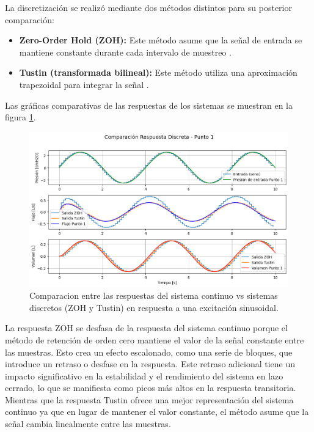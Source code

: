 \documentclass[journal]{IEEEtran}
\begin{document}
La discretización se realizó mediante dos métodos distintos para su posterior comparación:

\begin{itemize}
    \item \textbf{Zero-Order Hold (ZOH):} Este método asume que la señal de entrada se mantiene constante durante cada intervalo de muestreo \cite{mathworks_continuous_discrete_nodate}.
    \item \textbf{Tustin (transformada bilineal):} Este método utiliza una aproximación trapezoidal para integrar la señal \cite{mathworks_continuous_discrete_nodate}.
\end{itemize}

Las gráficas comparativas de las respuestas de los sistemas se muestran en la figura \ref{fig:simulacion_P4}. 

\begin{figure}[h!]
    \centering
    \includegraphics[width=1\linewidth]{Comparacion_P4.png}
    \caption{Comparacion entre las respuestas del sistema continuo vs sistemas discretos (ZOH y Tustin) en respuesta a una excitación sinusoidal.}
    \label{fig:simulacion_P4}
\end{figure}

La respuesta ZOH se desfasa de la respuesta del sistema continuo porque el método de retención de orden cero mantiene el valor de la señal constante entre las muestras. Esto crea un efecto escalonado, como una serie de bloques, que introduce un retraso o desfase en la respuesta. Este retraso adicional tiene un impacto significativo en la estabilidad y el rendimiento del sistema en lazo cerrado, lo que se manifiesta como picos más altos en la respuesta transitoria.
Mientras que la respuesta Tustin ofrece una mejor representación del sistema continuo ya que en lugar de mantener el valor constante, el método asume que la señal cambia linealmente entre las muestras.
\end{document}
